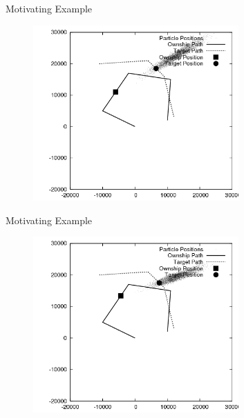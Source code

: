 \documentclass{beamer}
\begin{document}
\begin{frame}{Motivating Example}
\begin{figure}
\centering
\includegraphics[width=0.7\textwidth]{data/azimuth_only_1500.png}
\end{figure}
\end{frame}


\begin{frame}{Motivating Example}
\begin{figure}
\centering
\includegraphics[width=0.7\textwidth]{data/azimuth_only_1700.png}
\end{figure}
\end{frame}

\end{document}
